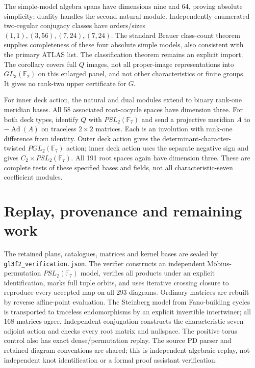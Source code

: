 \documentclass[11pt]{article}
\newcommand{\F}{\mathbb F}
\begin{document}
The simple-model algebra spans have dimensions nine and 64,
proving absolute simplicity; duality handles the second natural
module. Independently enumerated two-regular conjugacy classes
have orders/sizes $(1,1),(3,56),(7,24),(7,24)$. The standard
Brauer class-count theorem supplies completeness of these four
absolute simple models, also consistent with the primary ATLAS
list. The classification theorem remains an explicit import.
The corollary covers full $Q$ images, not all proper-image
representations into $GL_3(\F_2)$ on this enlarged panel, and not
other characteristics or finite groups. It gives no rank-two
upper certificate for $G$.

For inner deck action, the natural and dual modules extend to
binary rank-one meridian bases. All 58 associated root-cocycle
spaces have dimension three. For both deck types, identify $Q$
with $PSL_2(\F_7)$ and send a projective meridian $A$ to
$-\operatorname{Ad}(A)$ on traceless $2\times2$ matrices. Each is
an involution with rank-one difference from identity. Outer deck
action gives the determinant-character-twisted $PGL_2(\F_7)$
action; inner deck action uses the separate negative sign and
gives $C_2\times PSL_2(\F_7)$. All 191 root spaces again have
dimension three. These are complete tests of these specified
bases and fields, not all characteristic-seven coefficient modules.

\section{Replay, provenance and remaining work}

The retained plans, catalogues, matrices and kernel bases are
sealed by \texttt{gl3f2\_verification.json}. The verifier constructs
an independent M\"obius-permutation $PSL_2(\F_7)$ model, verifies
all products under an explicit identification, marks full tuple
orbits, and uses iterative crossing closure to reproduce every
accepted map on all 293 diagrams. Ordinary matrices are rebuilt
by reverse affine-point evaluation. The Steinberg model from
Fano-building cycles is transported to traceless endomorphisms
by an explicit invertible intertwiner; all 168 matrices agree.
Independent conjugation constructs the characteristic-seven
adjoint action and checks every root matrix and nullspace.
The positive torus control also has exact dense/permutation replay.
The source PD parser and retained diagram conventions are shared;
this is independent algebraic replay, not independent knot
identification or a formal proof assistant verification.
\end{document}
